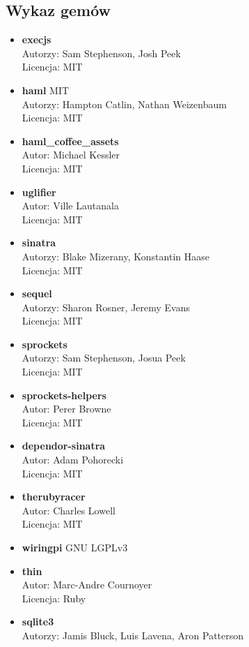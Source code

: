 \documentclass[11pt,a4paper, twoside]{article}
\begin{document}
\subsection{Wykaz gemów}
\begin{itemize}
\item \textbf{execjs}  \\
Autorzy: Sam Stephenson, Josh Peek \\
Licencja: MIT
\item \textbf{haml} MIT \\
Autorzy: Hampton Catlin, Nathan Weizenbaum \\
Licencja: MIT
\item \textbf{haml\_coffee\_assets} \\
Autor: Michael Kessler \\
Licencja: MIT
\item \textbf{uglifier} \\
Autor: Ville Lautanala \\
Licencja: MIT
\item \textbf{sinatra} \\
Autorzy: Blake Mizerany, Konstantin Haase \\
Licencja: MIT 
\item \textbf{sequel} \\
Autorzy: Sharon Rosner, Jeremy Evans \\
Licencja: MIT
\item \textbf{sprockets} \\
Autorzy: Sam Stephenson, Josua Peek \\
Licencja: MIT
\item \textbf{sprockets-helpers} \\ 
Autor: Perer Browne \\
Licencja: MIT
\item \textbf{dependor-sinatra} \\ 
Autor: Adam Pohorecki \\
Licencja: MIT
\item \textbf{therubyracer} \\ 
Autor: Charles Lowell \\
Licencja: MIT
\item \textbf{wiringpi} GNU LGPLv3
\item \textbf{thin} \\ 
Autor: Marc-Andre Cournoyer \\
Licencja: Ruby
\item \textbf{sqlite3} \\ 
Autorzy: Jamis Bluck, Luis Lavena, Aron Patterson \\

\end{itemize}
\end{document}
